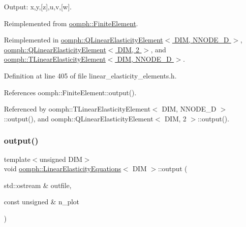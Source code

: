 Output\+: x,y,\mbox{[}z\mbox{]},u,v,\mbox{[}w\mbox{]}. 



Reimplemented from \hyperlink{classoomph_1_1FiniteElement_a2ad98a3d2ef4999f1bef62c0ff13f2a7}{oomph\+::\+Finite\+Element}.



Reimplemented in \hyperlink{classoomph_1_1QLinearElasticityElement_ab5746a722f2c015ceaace3afce89d797}{oomph\+::\+Q\+Linear\+Elasticity\+Element$<$ D\+I\+M, N\+N\+O\+D\+E\+\_\+D $>$}, \hyperlink{classoomph_1_1QLinearElasticityElement_ab5746a722f2c015ceaace3afce89d797}{oomph\+::\+Q\+Linear\+Elasticity\+Element$<$ D\+I\+M, 2 $>$}, and \hyperlink{classoomph_1_1TLinearElasticityElement_a76af9620bf824adfd6bef204af7a8f81}{oomph\+::\+T\+Linear\+Elasticity\+Element$<$ D\+I\+M, N\+N\+O\+D\+E\+\_\+D $>$}.



Definition at line 405 of file linear\+\_\+elasticity\+\_\+elements.\+h.



References oomph\+::\+Finite\+Element\+::output().



Referenced by oomph\+::\+T\+Linear\+Elasticity\+Element$<$ D\+I\+M, N\+N\+O\+D\+E\+\_\+D $>$\+::output(), and oomph\+::\+Q\+Linear\+Elasticity\+Element$<$ D\+I\+M, 2 $>$\+::output().

\mbox{\label{classoomph_1_1LinearElasticityEquations_ad651870ca4e0f45f7023407656d034ee}} 
\subsubsection{\texorpdfstring{output()}{output()}\hspace{0.1cm}{\footnotesize\ttfamily [2/4]}}
{\footnotesize\ttfamily template$<$unsigned D\+IM$>$ \\
void \hyperlink{classoomph_1_1LinearElasticityEquations}{oomph\+::\+Linear\+Elasticity\+Equations}$<$ D\+IM $>$\+::output (\begin{DoxyParamCaption}\item[{std\+::ostream \&}]{outfile,  }\item[{const unsigned \&}]{n\+\_\+plot }\end{DoxyParamCaption})\hspace{0.3cm}{\ttfamily [virtual]}}



